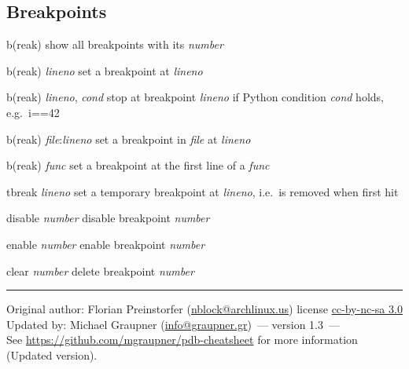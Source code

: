 \documentclass[10pt,landscape,a4paper]{article}
\makeatletter
\newcommand{\theauthor}{Florian Preinstorfer (\href{mailto:nblock@archlinux.us}{nblock@archlinux.us})}
\newcommand{\coauthor}{Michael Graupner (\href{mailto:info@graupner.gr}{info@graupner.gr})}
\newcommand{\theversion}{1.3}
\makeatother
\begin{document}
\begin{multicols}{2}
    \subsection{Breakpoints}
      \begin{eqlist}
        \item[b(reak)] show all breakpoints with its \textit{number}
        \item[b(reak) \textit{lineno}] set a breakpoint at \textit{lineno}
        \item[b(reak) \textit{lineno}, \textit{cond}] stop at breakpoint \textit{lineno} if Python condition \textit{cond} holds, e.g.\ i==42
        \item[b(reak) \textit{file}:\textit{lineno}] set a breakpoint in \textit{file} at \textit{lineno}
        \item[b(reak) \textit{func}] set a breakpoint at the first line of a \textit{func}
        \item[tbreak \textit{lineno}] set a temporary breakpoint at \textit{lineno}, i.e.\ is removed when first hit
        \item[disable \textit{number}] disable breakpoint \textit{number}
        \item[enable \textit{number}] enable breakpoint \textit{number}
        \item[clear \textit{number}] delete breakpoint \textit{number}
      \end{eqlist}

    \small{%
    \hrule
    Original author: \theauthor \hspace{3 mm} license \href{https://creativecommons.org/licenses/by-nc-sa/3.0}{cc-by-nc-sa 3.0}\\
    Updated by: \coauthor~--- version \theversion~---\\
    See \url{https://github.com/mgraupner/pdb-cheatsheet} for more information (Updated version).
    }
  \end{multicols}
\end{document}
